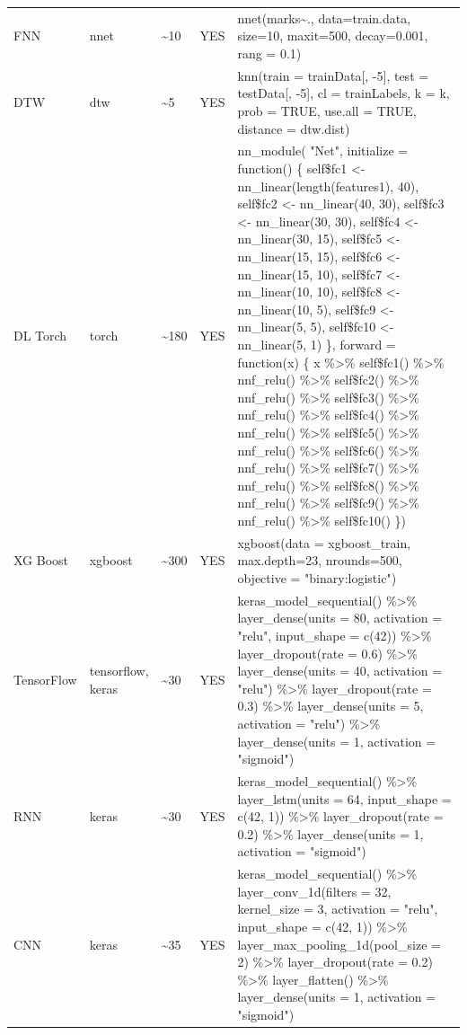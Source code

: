 \documentclass[preprint, 3p,
authoryear]{elsarticle} %
\begin{document}
\begin{landscape}
\begin{table}[!h]
{\begin{tabular}[t]{>{\raggedright\arraybackslash}p{1cm}>{\raggedright\arraybackslash}p{1cm}>{\raggedright\arraybackslash}p{1cm}>{\raggedright\arraybackslash}p{1cm}>{\raggedright\arraybackslash}p{13cm}}
FNN & nnet & \textasciitilde{}10 & YES & nnet(marks\textasciitilde{}., data=train.data, size=10, maxit=500, decay=0.001, rang = 0.1)\\
DTW & dtw & \textasciitilde{}5 & YES & knn(train = trainData[, -5], test = testData[, -5], cl = trainLabels, k = k, prob = TRUE, use.all = TRUE, distance = dtw.dist)\\
DL Torch & torch & \textasciitilde{}180 & YES & nn\_module(  "Net",  initialize = function() \{  self\$fc1 <- nn\_linear(length(features1), 40),  self\$fc2 <- nn\_linear(40, 30),  self\$fc3 <- nn\_linear(30, 30), self\$fc4 <- nn\_linear(30, 15),  self\$fc5 <- nn\_linear(15, 15),  self\$fc6 <- nn\_linear(15, 10), self\$fc7 <- nn\_linear(10, 10),  self\$fc8 <- nn\_linear(10, 5),  self\$fc9 <- nn\_linear(5, 5),  self\$fc10 <- nn\_linear(5, 1) \},
  forward = function(x) \{  x \%>\% 
      self\$fc1() \%>\%  nnf\_relu() \%>\%  self\$fc2() \%>\% nnf\_relu() \%>\% self\$fc3() \%>\%  nnf\_relu() \%>\% self\$fc4() \%>\% nnf\_relu() \%>\% self\$fc5() \%>\% nnf\_relu() \%>\% self\$fc6() \%>\%      nnf\_relu() \%>\%  self\$fc7() \%>\%  nnf\_relu() \%>\%  self\$fc8() \%>\%  nnf\_relu() \%>\% self\$fc9() \%>\%  nnf\_relu() \%>\% self\$fc10() \})\\
XG Boost & xgboost & \textasciitilde{}300 & YES & xgboost(data = xgboost\_train, max.depth=23, nrounds=500, objective = "binary:logistic")\\
TensorFlow & tensorflow, keras & \textasciitilde{}30 & YES & keras\_model\_sequential() \%>\% layer\_dense(units = 80, activation = "relu", input\_shape = c(42)) \%>\%  layer\_dropout(rate = 0.6) \%>\%  layer\_dense(units = 40, activation = "relu") \%>\%  layer\_dropout(rate = 0.3) \%>\%  layer\_dense(units = 5, activation = "relu") \%>\%   layer\_dense(units = 1, activation = "sigmoid")\\
RNN & keras & \textasciitilde{}30 & YES & keras\_model\_sequential() \%>\%  layer\_lstm(units = 64, input\_shape = c(42, 1)) \%>\%  layer\_dropout(rate = 0.2) \%>\%  layer\_dense(units = 1, activation = "sigmoid")\\
CNN & keras & \textasciitilde{}35 & YES & keras\_model\_sequential() \%>\%  layer\_conv\_1d(filters = 32, kernel\_size = 3, activation = "relu", input\_shape = c(42, 1)) \%>\%  layer\_max\_pooling\_1d(pool\_size = 2) \%>\%
layer\_dropout(rate = 0.2) \%>\%  layer\_flatten() \%>\%  layer\_dense(units = 1, activation = "sigmoid")\\
\bottomrule
\end{tabular}}
\end{table}
\end{landscape}

\renewcommand\refname{References}

\end{document}
